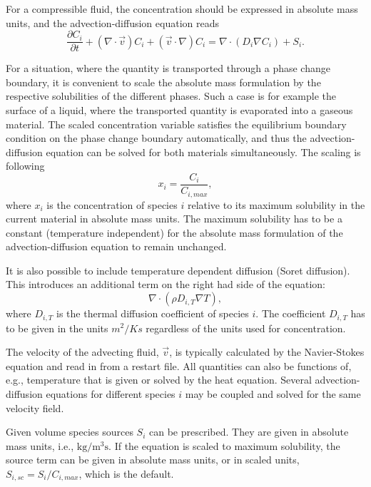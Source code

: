 \begin{versiona}
For a compressible fluid, the concentration should be expressed in absolute
mass units, and the advection-diffusion equation reads
\begin{equation}
\frac{\partial C_i}{\partial t} + (\nabla\cdot\vec{v})C_i  +(\vec v\cdot\nabla) C_i = \nabla\cdot(D_i\nabla C_i) + S_i.
\end{equation}

For a situation, where the quantity is transported through a phase
change boundary, it is convenient to scale the absolute mass
formulation by the respective solubilities of the different
phases. Such a case is for example the surface of a liquid, where the
transported quantity is evaporated into a gaseous material. The
scaled concentration variable satisfies the equilibrium boundary 
condition on the phase
change boundary automatically, and thus the advection-diffusion
equation can be solved for both materials simultaneously. The scaling
is following
\begin{equation}
x_i = \frac{C_i}{C_{i,max}},
\end{equation}
where $x_i$ is the concentration of species $i$ relative to its
maximum solubility in the current material in absolute mass units. The
maximum solubility has to be a constant (temperature independent) for
the absolute mass formulation of the advection-diffusion equation to
remain unchanged.

It is also possible to include temperature dependent diffusion (Soret
diffusion). This introduces an additional term on the right had side
of the equation:
\begin{equation}
\nabla\cdot(\rho D_{i,T}\nabla T),
\end{equation}
where $D_{i,T}$ is the thermal diffusion coefficient of species
$i$. The coefficient $D_{i,T}$ has to be given in the units $m^2/Ks$
regardless of the units used for concentration.

The velocity of the advecting fluid, $\vec v$, is typically calculated by
the Navier-Stokes equation and read in from a restart file. All quantities can
also be functions of, e.g., temperature that is given or solved by the heat
equation. Several advection-diffusion equations for different species $i$ may
be coupled and solved for the same velocity field.

Given volume species sources $S_i$ can be prescribed. They are given
in absolute mass units, i.e., $\mathrm{kg}/\mathrm{m}^3\mathrm{s}$.
If the equation is scaled to maximum solubility, the source term can
be given in absolute mass units, or in scaled units, $S_{i,sc} = S_i /
C_{i,max}$, which is the default.



\end{versiona}
